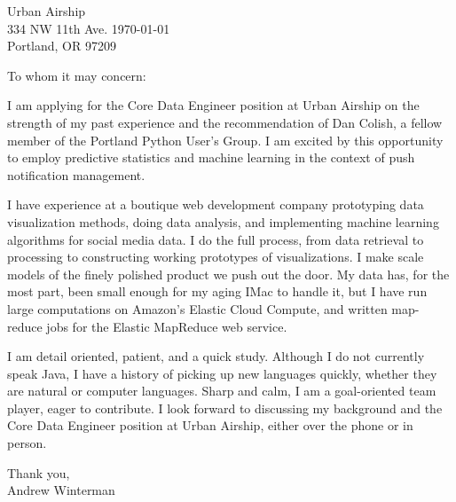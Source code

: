 \documentclass[11pt]{letter}
\date{}
\begin{document}
\begin{letter}{Urban Airship \\
334 NW 11th Ave. \hfill \today \\
Portland, OR 97209\\ 
}
\address{}

\begin{adjustwidth}{1in}{1in}

    \opening{To whom it may concern:}

    \thispagestyle{fancy}
I am applying for the Core Data Engineer position at Urban Airship on the
strength of my past experience and the recommendation of Dan Colish, a fellow
member of the Portland Python User's Group. I am excited by this opportunity to
employ predictive statistics and machine learning in the context of push
notification management.

I have experience at a boutique web development company prototyping data
visualization methods, doing data analysis, and implementing machine learning
algorithms for social media data. I do the full process, from data retrieval to
processing to constructing working prototypes of visualizations. I make scale
models of the finely polished product we push out the door. My data has, for
the most part, been small enough for my aging IMac to handle it, but I have run
large computations on Amazon's Elastic Cloud Compute, and written map-reduce
jobs for the Elastic MapReduce web service.

I am detail oriented, patient, and a quick study.  Although I do not currently
speak Java, I have a history of picking up new languages quickly, whether they
are natural or computer languages.  Sharp and calm, I am a goal-oriented team
player, eager to contribute. I look forward to discussing my background and the
Core Data Engineer position at Urban Airship, either over the phone or in
person.

\closing{
Thank you, \\
Andrew Winterman}


\end{adjustwidth}


\end{letter}
\end{document}
